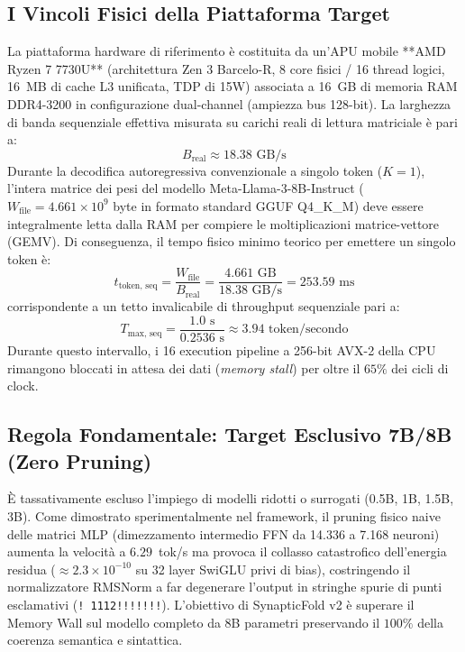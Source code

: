 \documentclass[10pt,a4paper]{article}
\theoremstyle{definition}
\begin{document}
\subsection{I Vincoli Fisici della Piattaforma Target}
La piattaforma hardware di riferimento \`e costituita da un'APU mobile **AMD Ryzen 7 7730U** (architettura Zen 3 Barcelo-R, 8 core fisici / 16 thread logici, 16~MB di cache L3 unificata, TDP di 15W) associata a 16~GB di memoria RAM DDR4-3200 in configurazione dual-channel (ampiezza bus 128-bit).
La larghezza di banda sequenziale effettiva misurata su carichi reali di lettura matriciale \`e pari a:
\begin{equation}
B_{\text{real}} \approx 18.38 \text{ GB/s}
\end{equation}
Durante la decodifica autoregressiva convenzionale a singolo token ($K=1$), l'intera matrice dei pesi del modello Meta-Llama-3-8B-Instruct ($W_{\text{file}} = 4.661 \times 10^9$ byte in formato standard GGUF Q4\_K\_M) deve essere integralmente letta dalla RAM per compiere le moltiplicazioni matrice-vettore (GEMV). Di conseguenza, il tempo fisico minimo teorico per emettere un singolo token \`e:
\begin{equation}
t_{\text{token, seq}} = \frac{W_{\text{file}}}{B_{\text{real}}} = \frac{4.661\text{ GB}}{18.38\text{ GB/s}} = 253.59\text{ ms}
\end{equation}
corrispondente a un tetto invalicabile di throughput sequenziale pari a:
\begin{equation}
T_{\text{max, seq}} = \frac{1.0\text{ s}}{0.2536\text{ s}} \approx 3.94\text{ token/secondo}
\end{equation}
Durante questo intervallo, i 16 execution pipeline a 256-bit AVX-2 della CPU rimangono bloccati in attesa dei dati (\textit{memory stall}) per oltre il $65\%$ dei cicli di clock. 

\subsection{Regola Fondamentale: Target Esclusivo 7B/8B (Zero Pruning)}
\`E tassativamente escluso l'impiego di modelli ridotti o surrogati (0.5B, 1B, 1.5B, 3B). Come dimostrato sperimentalmente nel framework, il pruning fisico naive delle matrici MLP (dimezzamento intermedio FFN da 14.336 a 7.168 neuroni) aumenta la velocit\`a a $6.29$~tok/s ma provoca il collasso catastrofico dell'energia residua ($\approx 2.3 \times 10^{-10}$ su 32 layer SwiGLU privi di bias), costringendo il normalizzatore RMSNorm a far degenerare l'output in stringhe spurie di punti esclamativi (\texttt{! 1112!!!!!!!}).
L'obiettivo di SynapticFold v2 \`e superare il Memory Wall sul modello completo da 8B parametri preservando il $100\%$ della coerenza semantica e sintattica.
\end{document}
